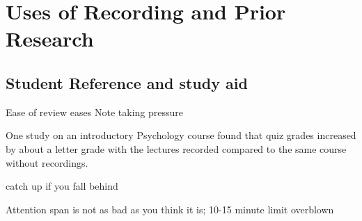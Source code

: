 \documentclass[sigconf]{acmart}
\begin{document}
\section{Uses of Recording and Prior Research}
\label{research}
\subsection{Student Reference and study aid}


Ease of review
eases Note taking pressure


One study \cite{shimoff2001effects}  on an introductory Psychology course found that quiz grades increased by about a letter grade with the lectures recorded compared to the same course without recordings.

catch up if you fall behind \cite{young2008lectures}

Attention span is not as bad as you think it is; 10-15 minute limit overblown \cite{bradbury2016attention} \cite{wilson2007attention}
\end{document}

